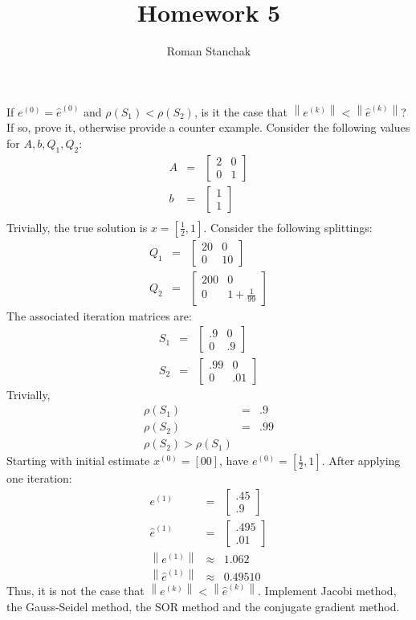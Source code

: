 \documentclass{article}
\author{Roman Stanchak}
\title{Homework 5}
\newcommand{\ea}[1]{\begin{eqnarray*}#1\end{eqnarray*}}
\newcommand{\norm}[1]{\left\|{#1}\right\|}
\newcommand{\mat}[2]{\left[\begin{array}{#1}#2\end{array}\right]}
\begin{document}

\maketitle
 If $e^{(0)}=\hat{e}^{(0)}$ and $\rho(S_1) < \rho(S_2)$, is it the 
case that $\norm{ e^{(k)} } < \norm{\hat{e}^{(k)}}$?  If so, prove it, otherwise provide
a counter example.
Consider the following values for $A,b,Q_1,Q_2$:
\ea{
A&=& \mat{cc}{2 & 0 \\ 0 & 1}\\
b&=& \mat{c}{1 \\ 1}\\
}
Trivially, the true solution is $x=[\frac{1}{2}, 1]$.  
Consider the following splittings:
\ea{
	Q_1&=& \mat{cc}{20 & 0 \\ 0 & 10}\\
	Q_2&=& \mat{cc}{200 & 0 \\ 0 & 1+\frac{1}{99}}
}
The associated iteration matrices are:
\ea{
	S_1&=& \mat{cc}{.9 & 0 \\ 0 & .9}\\
	S_2&=& \mat{cc}{.99 & 0 \\ 0 & .01}
}
Trivially,
\ea{
	\rho(S_1)&=& .9\\
	\rho(S_2)&=& .99\\
	\rho(S_2) > \rho(S_1)
}
Starting with initial estimate $x^{(0)}=[0 0]$, have $e^{(0)}=[\frac{1}{2}, 1]$.
After applying one iteration:
\ea{
	e^{(1)} &=& \mat{c}{.45 \\ .9}\\
	\hat{e}^{(1)}&=& \mat{c}{.495 \\ .01}\\
	\norm{ e^{(1)} } &\approx& 1.062 \\
	\norm{ \hat{e}^{(1)} } &\approx&  0.49510 
}
Thus, it is not the case that $\norm{ e^{(k)} } < \norm{\hat{e}^{(k)}}$.
 Implement Jacobi method, the Gauss-Seidel method, the SOR method and 
the conjugate gradient method.
\end{document}
